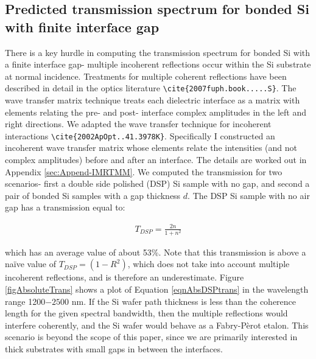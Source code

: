 \documentclass[osajnl,preprint,showpacs,superscriptaddress,12pt]{revtex4-1} %
\begin{document}
\subsection{Predicted transmission spectrum for bonded Si with finite interface gap}
\label{secTheory}
There is a key hurdle in computing the transmission spectrum for bonded Si with a finite interface gap- multiple incoherent reflections occur within the Si substrate at normal incidence.  Treatments for multiple coherent reflections have been described in detail in the optics literature \verb|\cite{2007fuph.book.....S}|.  The wave transfer matrix technique treats each dielectric interface as a matrix with elements relating the pre- and post- interface complex amplitudes in the left and right directions.  We adapted the wave transfer technique for incoherent interactions \verb|\cite{2002ApOpt..41.3978K}|.  Specifically I constructed an incoherent wave transfer matrix whose elements relate the intensities (and not complex amplitudes) before and after an interface.  The details are worked out in Appendix \ref{sec:Append-IMRTMM}.  We computed the transmission for two scenarios- first a double side polished (DSP) Si sample with no gap, and second a pair of bonded Si samples with a gap thickness $d$.  The DSP Si sample with no air gap has a transmission equal to:

\begin{eqnarray}
T_{DSP} = \frac{2n}{1+n^2} \label{eqnAbsDSPtrans}
\end{eqnarray}

which has an average value of about 53\%.  Note that this transmission is above a na\"ive value of $T_{DSP}=(1-R^2)$, which does not take into account multiple incoherent reflections, and is therefore an underestimate.  Figure \ref{figAbsoluteTrans} shows a plot of Equation \ref{eqnAbsDSPtrans} in the wavelength range 1200$-2500$ nm.  If the Si wafer path thickness is less than the coherence length for the given spectral bandwidth, then the multiple reflections would interfere coherently, and the Si wafer would behave as a Fabry-P\`erot etalon.  This scenario is beyond the scope of this paper, since we are primarily interested in thick substrates with small gaps in between the interfaces.%
\end{document}
